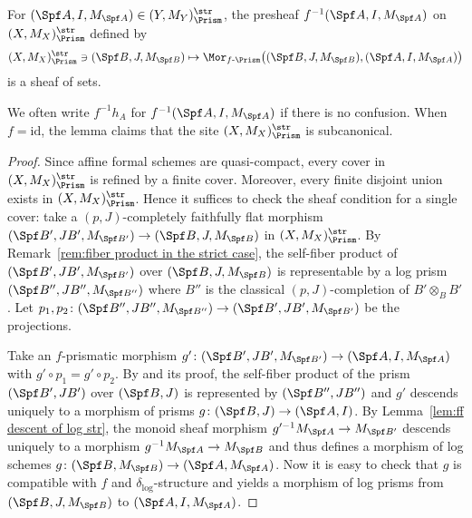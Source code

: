  
\begin{lem}\label{lem:pullback of representable prismatic sheaf}
For $(\Spf A, I, M_{\Spf A})\in (Y,M_Y)_\Prism^{\str}$, the presheaf $f^{-1}(\Spf A, I, M_{\Spf A})$ on $(X,M_X)_\Prism^{\str}$ defined by
\[
(X,M_X)_\Prism^{\str}\ni(\Spf B, J, M_{\Spf B})\mapsto \Mor_{f\text{-}\Prism}\bigl((\Spf B, J, M_{\Spf B}),(\Spf A, I, M_{\Spf A})\bigr)
\]
is a sheaf of sets. 
\end{lem} 

We often write $f^{-1} h_A$ for $f^{-1}(\Spf A, I, M_{\Spf A})$ if there is no confusion. When $f=\mathrm{id}$, the lemma claims that the site $(X,M_X)_\Prism^{\str}$ is subcanonical.

\begin{proof}
Since affine formal schemes are quasi-compact, every cover in $(X,M_X)_\Prism^{\str}$ is refined by a finite cover. Moreover, every finite disjoint union exists in $(X,M_X)_\Prism^{\str}$. Hence it suffices to check the sheaf condition for a single cover: take a $(p,J)$-completely faithfully flat morphism $(\Spf B',JB', M_{\Spf B'})\rightarrow (\Spf B, J,M_{\Spf B})$ in $(X,M_X)_\Prism^{\str}$.
By Remark~\ref{rem:fiber product in the strict case}, the self-fiber product of $(\Spf B',JB', M_{\Spf B'})$ over $(\Spf B, J,M_{\Spf B})$ is representable by a log prism $(\Spf B'', JB'', M_{\Spf B''})$ where $B''$ is the classical $(p, J)$-completion of $B'\otimes_B B'$. 
Let $p_1,p_2\colon (\Spf B'', JB'', M_{\Spf B''})\rightarrow (\Spf B', JB', M_{\Spf B'})$ be the projections. 

Take an $f$-prismatic morphism $g'\colon (\Spf B', JB', M_{\Spf B'})\rightarrow (\Spf A, I, M_{\Spf A})$ with $g'\circ p_1=g'\circ p_2$. By \cite[Cor.~3.12]{bhatt-scholze-prismaticcohom} and its proof, the self-fiber product of the prism $(\Spf B',JB')$ over $(\Spf B, J)$ is represented by $(\Spf B'', JB'')$ and $g'$ descends uniquely to a morphism of prisms $g\colon (\Spf B, J)\rightarrow (\Spf A, I)$.
By Lemma~\ref{lem:ff descent of log str}, the monoid sheaf morphism $g'^{-1}M_{\Spf A}\rightarrow M_{\Spf B'}$ descends uniquely to a morphism $g^{-1}M_{\Spf A}\rightarrow M_{\Spf B}$ and thus defines a morphism of log schemes $g\colon (\Spf B,M_{\Spf B})\rightarrow (\Spf A, M_{\Spf A})$. Now it is easy to check that $g$ is compatible with $f$ and $\delta_\log$-structure and yields a morphism of log prisms from $(\Spf B, J,M_{\Spf B})$ to $(\Spf A, I, M_{\Spf A})$. 
\end{proof}

